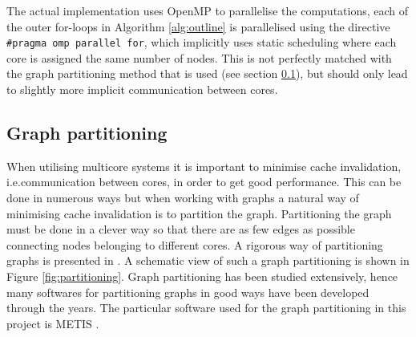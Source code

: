 The actual implementation uses OpenMP \cite{openmp} to parallelise the computations, each of the outer for-loops in Algorithm \ref{alg:outline} is parallelised using the directive \texttt{\#pragma omp parallel for}, which implicitly uses static scheduling where each core is assigned the same number of nodes. This is not perfectly matched with the graph partitioning method that is used (see section \ref{sec:graph_part}), but should only lead to slightly more implicit communication between cores.

\subsection{Graph partitioning}
\label{sec:graph_part}
When utilising multicore systems it is important to minimise cache invalidation, i.e.\@ communication between cores, in order to get good performance. This can be done in numerous ways but when working with graphs a natural way of minimising cache invalidation is to partition the graph. Partitioning the graph must be done in a clever way so that there are as few edges as possible connecting nodes belonging to different cores. A rigorous way of partitioning graphs is presented in \cite{Lasalle}. A schematic view of such a graph partitioning is shown in Figure \ref{fig:partitioning}. Graph partitioning has been studied extensively, hence many softwares for partitioning graphs in good ways have been developed through the years. The particular software used for the graph partitioning in this project is METIS \cite{Lasalle}. 

